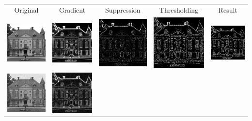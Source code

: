 \documentclass[12pt,a4paper,notitlepage,oneside,amsmath,amssymb]{article}
\begin{document}
\begin{CJK*}{UTF8}{bkai}
\begin{enumerate}[label=(\alph*)]
\begin{enumerate}
    \end{enumerate}

    \begin{table}
    \begin{tabular}[h!]{ccccc}
      Original & Gradient & Suppression & Thresholding & Result \\
      \includegraphics[width=.18\linewidth]{sample1}&
\includegraphics[width=.18\linewidth]{E3_sample1_gradient}&
\includegraphics[width=.18\linewidth]{E3_sample1_suppression}&
\includegraphics[width=.18\linewidth]{E3_sample1_thresholding}&
\includegraphics[width=.18\linewidth]{E3_sample1}\\
\includegraphics[width=.18\linewidth]{sample2}&
\includegraphics[width=.18\linewidth]{E3_sample2_gradient}&

\end{tabular}
\end{table}
\end{enumerate}
\end{CJK*}
\end{document}

